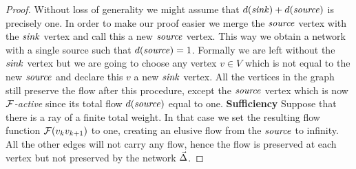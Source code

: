\documentclass[12pt]{article}
\begin{document}
    \begin{proof}
      Without loss of generality we might assume that $d(\mathit{sink}) + d(\mathit{source})$ is precisely one.
      In order to make our proof easier we merge the $\mathit{source}$ vertex with the $\mathit{sink}$ vertex and call this a
        new $\mathit{source}$ vertex.
      This way we obtain a network with a single source such that $d(\mathit{source}) = 1$.
      Formally we are left without the $\mathit{sink}$ vertex but we are going to choose any vertex $v \in V$ which
        is not equal to the new $\mathit{source}$ and declare this $v$ a new $\mathit{sink}$ vertex.
      All the vertices in the graph still preserve the flow after this procedure, except the $\mathit{source}$ vertex
        which is now \emph{$\mathcal{F}$-active} since its total flow $d(\mathit{source})$ equal to one.
      \noindent\textbf{Sufficiency}
      Suppose that there is a ray of a finite total weight. 
      In that case we set the resulting flow function $\mathcal{F}(v_k v_{k+1})$ to one, creating an elusive flow
        from the $\mathit{source}$ to infinity. All the other edges will not carry any flow, hence the flow is preserved
        at each vertex but not preserved by the network $\vec{\Delta}$.


\end{proof}
\end{document}
